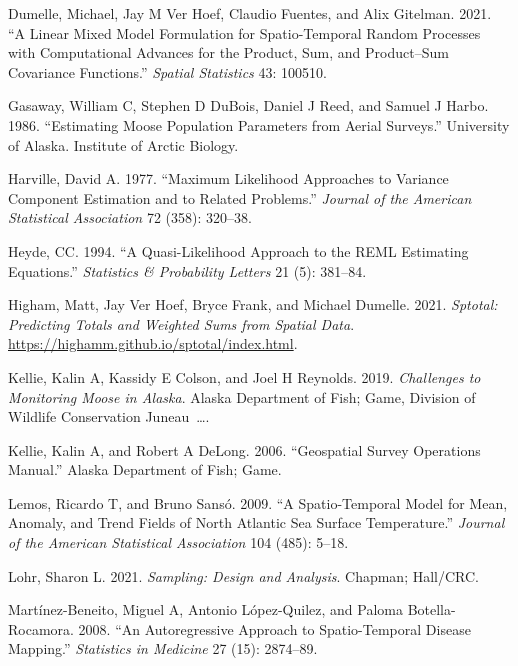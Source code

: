 \documentclass[smallextended]{svjour3}       %
\newlength{\cslhangindent}
\newlength{\cslentryspacingunit} %
\newenvironment{CSLReferences}[2] %
 {%
  \setlength{\parindent}{0pt}
  \ifodd #1
  \let\oldpar\par
  \def\par{\hangindent=\cslhangindent\oldpar}
  \fi
  \setlength{\parskip}{#2\cslentryspacingunit}
 }%
 {}
\begin{document}
\begin{CSLReferences}{1}{0}
\leavevmode{}%
Dumelle, Michael, Jay M Ver Hoef, Claudio Fuentes, and Alix Gitelman.
2021. {``A Linear Mixed Model Formulation for Spatio-Temporal Random
Processes with Computational Advances for the Product, Sum, and
Product--Sum Covariance Functions.''} \emph{Spatial Statistics} 43:
100510.

\leavevmode{}%
Gasaway, William C, Stephen D DuBois, Daniel J Reed, and Samuel J Harbo.
1986. {``Estimating Moose Population Parameters from Aerial Surveys.''}
University of Alaska. Institute of Arctic Biology.

\leavevmode{}%
Harville, David A. 1977. {``Maximum Likelihood Approaches to Variance
Component Estimation and to Related Problems.''} \emph{Journal of the
American Statistical Association} 72 (358): 320--38.

\leavevmode{}%
Heyde, CC. 1994. {``A Quasi-Likelihood Approach to the REML Estimating
Equations.''} \emph{Statistics \& Probability Letters} 21 (5): 381--84.

\leavevmode{}%
Higham, Matt, Jay Ver Hoef, Bryce Frank, and Michael Dumelle. 2021.
\emph{Sptotal: Predicting Totals and Weighted Sums from Spatial Data}.
\url{https://highamm.github.io/sptotal/index.html}.

\leavevmode{}%
Kellie, Kalin A, Kassidy E Colson, and Joel H Reynolds. 2019.
\emph{Challenges to Monitoring Moose in Alaska}. Alaska Department of
Fish; Game, Division of Wildlife Conservation Juneau~\ldots.

\leavevmode{}%
Kellie, Kalin A, and Robert A DeLong. 2006. {``Geospatial Survey
Operations Manual.''} Alaska Department of Fish; Game.

\leavevmode{}%
Lemos, Ricardo T, and Bruno Sansó. 2009. {``A Spatio-Temporal Model for
Mean, Anomaly, and Trend Fields of North Atlantic Sea Surface
Temperature.''} \emph{Journal of the American Statistical Association}
104 (485): 5--18.

\leavevmode{}%
Lohr, Sharon L. 2021. \emph{Sampling: Design and Analysis}. Chapman;
Hall/CRC.

\leavevmode{}%
Martínez-Beneito, Miguel A, Antonio López-Quilez, and Paloma
Botella-Rocamora. 2008. {``An Autoregressive Approach to Spatio-Temporal
Disease Mapping.''} \emph{Statistics in Medicine} 27 (15): 2874--89.


\end{CSLReferences}
\end{document}
